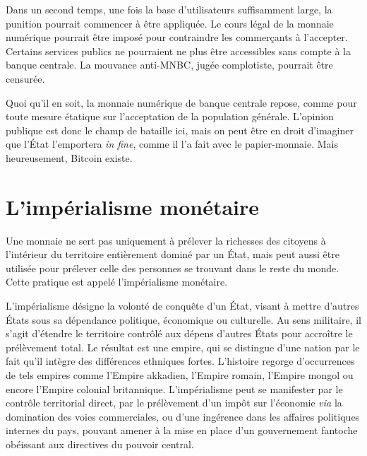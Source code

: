 Dans un second temps, une fois la base d'utilisateurs suffisamment large, la punition pourrait commencer à être appliquée. Le cours légal de la monnaie numérique pourrait être imposé pour contraindre les commerçants à l'accepter. Certains services publics ne pourraient ne plus être accessibles sans compte à la banque centrale. La mouvance anti-MNBC, jugée complotiste, pourrait être censurée.

%
Quoi qu'il en soit, la monnaie numérique de banque centrale repose, comme pour toute mesure étatique sur l'acceptation de la population générale. L'opinion publique est donc le champ de bataille ici, mais on peut être en droit d'imaginer que l'État l'emportera \emph{in fine}, comme il l'a fait avec le papier-monnaie. Mais heureusement, Bitcoin existe.



\section*{L'impérialisme monétaire} %

Une monnaie ne sert pas uniquement à prélever la richesses des citoyens à l'intérieur du territoire entièrement dominé par un État, mais peut aussi être utilisée pour prélever celle des personnes se trouvant dans le reste du monde. Cette pratique est appelé l'impérialisme monétaire.

L'impérialisme désigne la volonté de conquête d'un État, visant à mettre d'autres États sous sa dépendance politique, économique ou culturelle. Au sens militaire, il s'agit d'étendre le territoire contrôlé aux dépens d'autres États pour accroître le prélèvement total. Le résultat est une empire, qui se distingue d'une nation par le fait qu'il intègre des différences ethniques fortes. L'histoire regorge d'occurrences de tels empires comme l'Empire akkadien, l'Empire romain, l'Empire mongol ou encore l'Empire colonial britannique. L'impérialisme peut se manifester par le contrôle territorial direct, par le prélèvement d'un impôt sur l'économie \emph{via} la domination des voies commerciales, ou d'une ingérence dans les affaires politiques internes du pays, pouvant amener à la mise en place d'un gouvernement fantoche obéissant aux directives du pouvoir central.

